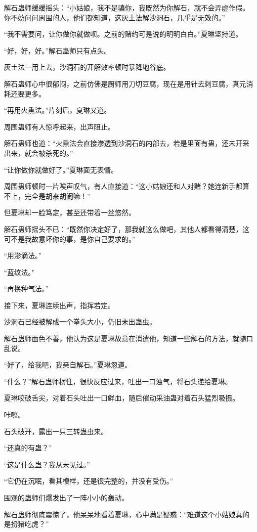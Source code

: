 \begin{this_body}
解石蛊师缓缓摇头：“小姑娘，我不是骗你，我既然为你解石，就不会弄虚作假。你不妨问问周围的人，他们都知道，这灰土法解沙洞石，几乎是无效的。”

“我不需要问，让你做你就做呗。之前的赌约可是说的明明白白。”夏琳坚持道。

“好，好，好。”解石蛊师只有点头。

灰土法一用上去，沙洞石的开解效率顿时暴降地谷底。

解石蛊师心中很郁闷，之前仿佛是厨师用刀切豆腐，现在是用针去刺豆腐，真元消耗还要更多。

“再用火熏法。”片刻后，夏琳又道。

周围蛊师有人惊呼起来，出声阻止。

解石蛊师也道：“火熏法会直接渗透到沙洞石的内部去，若是里面有蛊，还未开采出来，就会被杀死的。”

“让你做你就做好了。”夏琳面无表情。

周围蛊师顿时一片唉声叹气，有人直接道：“这小姑娘还和人对赌？她连新手都算不上，完全是胡来胡闹嘛！”

但夏琳却一脸笃定，甚至还带着一丝悠然。

解石蛊师摇头不已：“既然你决定好了，那我就这么做吧，其他人都看得清楚，这可不是我故意坏你的事，是你自己要求的。”

“用渗滴法。”

“蓝纹法。”

“再换种气法。”

接下来，夏琳连续出声，指挥若定。

沙洞石已经被解成一个拳头大小，仍旧未出蛊虫。

解石蛊师面色不善，他认为这是夏琳故意在消遣他，知道一些解石的方法，就随口乱说。

“好了，给我吧，我亲自解石。”夏琳忽道。

“什么？”解石蛊师楞住，很快反应过来，吐出一口浊气，将石头递给夏琳。

夏琳咬破舌尖，对着石头吐出一口鲜血，随后催动采油蛊对着石头猛烈吸摄。

咔嚓。

石头破开，露出一只三转蛊虫来。

“还真的有蛊？”

“这是什么蛊？我从未见过。”

“它仍在沉眠，看其模样，还是很完整的，并没有受伤。”

围观的蛊师们爆发出了一阵小小的轰动。

解石蛊师彻底震惊了，他呆呆地看着夏琳，心中满是疑惑：“难道这个小姑娘真的是扮猪吃虎？”


\end{this_body}

